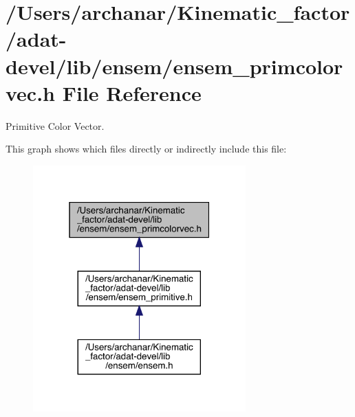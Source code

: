 \hypertarget{adat-devel_2lib_2ensem_2ensem__primcolorvec_8h}{}\section{/\+Users/archanar/\+Kinematic\+\_\+factor/adat-\/devel/lib/ensem/ensem\+\_\+primcolorvec.h File Reference}
\label{adat-devel_2lib_2ensem_2ensem__primcolorvec_8h}


Primitive Color Vector.  


This graph shows which files directly or indirectly include this file\+:
\nopagebreak
\begin{figure}[H]
\begin{center}
\leavevmode
\includegraphics[width=232pt]{dc/d8e/adat-devel_2lib_2ensem_2ensem__primcolorvec_8h__dep__incl}
\end{center}
\end{figure}
